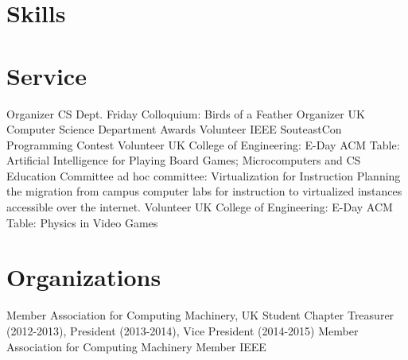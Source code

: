 \documentclass[10pt]{moderncv}
\begin{document}
\section{Skills}

\section{Service}
  {Organizer}
  {CS Dept. Friday Colloquium: Birds of a Feather}
  {}{}{}
  {Organizer}
  {UK Computer Science Department Awards}
  {}{}{}
  {Volunteer}
  {IEEE SouteastCon Programming Contest}
  {}{}{}
  {Volunteer}
  {UK College of Engineering: E-Day}
  {}{}
  {ACM Table: Artificial Intelligence for Playing Board Games;
   Microcomputers and CS Education}
  {Committee}
  {ad hoc committee: Virtualization for Instruction}
  {}
  {}
  {Planning the migration from campus computer labs for instruction to
   virtualized instances accessible over the internet.}
  {Volunteer}
  {UK College of Engineering: E-Day}
  {}
  {}
  {ACM Table: Physics in Video Games}

\section{Organizations}
  {Member}
  {Association for Computing Machinery, UK Student Chapter}
  {}
  {}
  {Treasurer (2012-2013), President (2013-2014), Vice President (2014-2015)}
  {Member}
  {Association for Computing Machinery}
  {}{}{}
  {Member}
  {IEEE}
  {}{}{}
\end{document}

